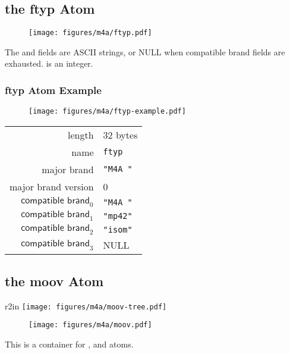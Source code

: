 \subsection{the ftyp Atom}
\begin{figure}[h]
  \texttt{[image: figures/m4a/ftyp.pdf]}
\end{figure}
\par
\noindent
The  and  fields are ASCII strings,
or NULL when compatible brand fields are exhausted.
 is an integer.

\subsubsection{ftyp Atom Example}
\begin{figure}[h]
  \texttt{[image: figures/m4a/ftyp-example.pdf]}
\end{figure}
\par
\noindent
\begin{tabular}{rl}
  \textsf{length} & 32 bytes \\
  \textsf{name} & \texttt{ftyp} \\
  \textsf{major brand} & \texttt{"M4A "} \\
  \textsf{major brand version} & 0 \\
  $\textsf{compatible brand}_0$ & \texttt{"M4A "} \\
  $\textsf{compatible brand}_1$ & \texttt{"mp42"} \\
  $\textsf{compatible brand}_2$ & \texttt{"isom"} \\
  $\textsf{compatible brand}_3$ & NULL \\
\end{tabular}

\clearpage

\subsection{the moov Atom}
\begin{wrapfigure}[5]{r}{2in}
  \texttt{[image: figures/m4a/moov-tree.pdf]}
\end{wrapfigure}

\begin{figure}[h]
  \texttt{[image: figures/m4a/moov.pdf]}
\end{figure}
\par
\noindent
This is a container for \hyperref[atom:mvhd]{},
\hyperref[atom:trak]{} and
\hyperref[atom:udta]{} atoms.

